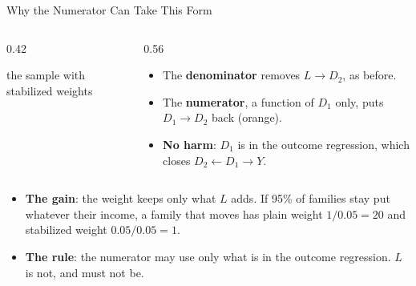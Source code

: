 \documentclass[aspectratio=169,11pt,xcolor=dvipsnames]{beamer}
\begin{document}
\begin{frame}{Why the Numerator Can Take This Form}
\begin{columns}[c]
\begin{column}{0.42\linewidth}
\begin{center}

{\footnotesize the sample with stabilized weights}
\end{center}
\end{column}
\begin{column}{0.56\linewidth}
\begin{itemize}\itemsep5pt
  \item The \textbf{denominator} removes $L \to D_2$, as before.
  \item The \textbf{numerator}, a function of $D_1$ only, puts $D_1 \to D_2$ back (orange).
  \item \textbf{No harm}: $D_1$ is in the outcome regression, which closes
        $D_2 \leftarrow D_1 \to Y$.
\end{itemize}
\end{column}
\end{columns}
\vskip8pt
\begin{itemize}\itemsep6pt
  \item \textbf{The gain}: the weight keeps only what $L$ adds. If 95\% of families stay put
        whatever their income, a family that moves has plain weight $1 / 0.05 = 20$ and
        stabilized weight $0.05 / 0.05 = 1$.
  \item \textbf{The rule}: the numerator may use only what is in the outcome regression. $L$ is
        not, and must not be.
\end{itemize}
\end{frame}
\end{document}
